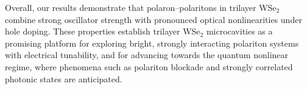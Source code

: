 Overall, our results demonstrate that polaron–polaritons in trilayer WSe$_2$ combine strong oscillator strength with pronounced optical nonlinearities under hole doping. 
These properties establish trilayer WSe$_2$ microcavities as a promising platform for exploring bright, strongly interacting polariton systems with electrical tunability, and for advancing towards the quantum nonlinear regime, where phenomena such as polariton blockade\cite{Delteil2019-pp,Verger2006-jz,Munoz-Matutano2019-cg} and strongly correlated photonic states\cite{Hartmann2006-we, Carusotto2013-mf} are anticipated.
